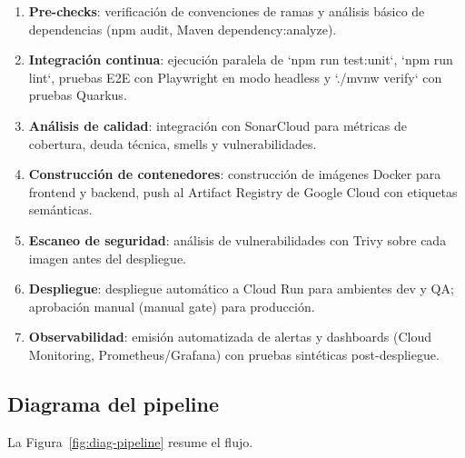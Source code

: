\documentclass[12pt,letterpaper]{article}
\begin{document}
\begin{enumerate}[leftmargin=1.2cm]
  \item \textbf{Pre-checks}: verificación de convenciones de ramas y análisis básico de dependencias (npm audit, Maven dependency:analyze).
  \item \textbf{Integración continua}: ejecución paralela de `npm run test:unit`, `npm run lint`, pruebas E2E con Playwright en modo headless y `./mvnw verify` con pruebas Quarkus.
  \item \textbf{Análisis de calidad}: integración con SonarCloud para métricas de cobertura, deuda técnica, smells y vulnerabilidades.
  \item \textbf{Construcción de contenedores}: construcción de imágenes Docker para frontend y backend, push al Artifact Registry de Google Cloud con etiquetas semánticas.
  \item \textbf{Escaneo de seguridad}: análisis de vulnerabilidades con Trivy sobre cada imagen antes del despliegue.
  \item \textbf{Despliegue}: despliegue automático a Cloud Run para ambientes dev y QA; aprobación manual (manual gate) para producción.
  \item \textbf{Observabilidad}: emisión automatizada de alertas y dashboards (Cloud Monitoring, Prometheus/Grafana) con pruebas sintéticas post-despliegue.
\end{enumerate}

\subsection{Diagrama del pipeline}
La Figura~\ref{fig:diag-pipeline} resume el flujo.
\end{document}
